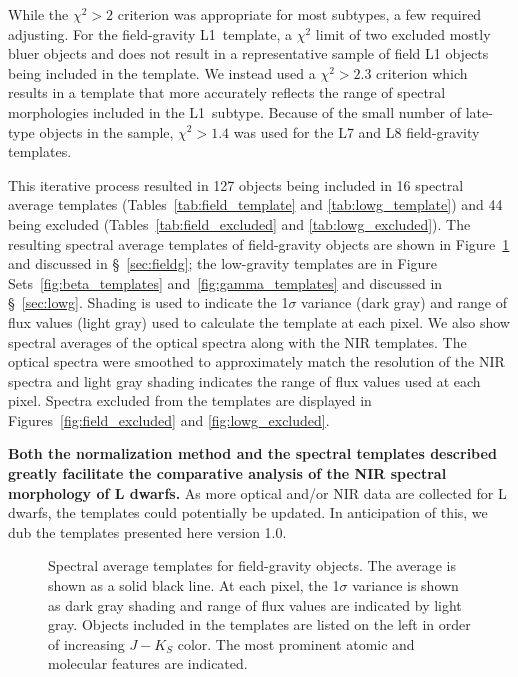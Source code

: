 \documentclass[12pt]{aastex6}
\begin{document}
While the $\chi^2 > 2$ criterion was appropriate for most subtypes, a few required adjusting.
For the field-gravity L1~template, a $\chi^2$ limit of two excluded mostly bluer objects and does not result in a representative sample of field L1 objects being included in the template.
We instead used a $\chi^2 > 2.3$ criterion which results in a template that more accurately reflects the range of spectral morphologies included in the L1~subtype.
Because of the small number of late-type objects in the sample, $\chi^2 > 1.4$ was used for the L7 and L8 field-gravity templates.

This iterative process resulted in 127 objects being included in 16 spectral average templates (Tables~\ref{tab:field_template} and \ref{tab:lowg_template}) and 44 being excluded (Tables~\ref{tab:field_excluded} and \ref{tab:lowg_excluded}).
The resulting spectral average templates of field-gravity objects are shown in Figure~\ref{fig:field_templates} and discussed in \S~\ref{sec:fieldg}; the low-gravity templates are in Figure Sets~\ref{fig:beta_templates} and~\ref{fig:gamma_templates} and discussed in \S~\ref{sec:lowg}.
Shading is used to indicate the 1$\sigma$ variance (dark gray) and range of flux values (light gray) used to calculate the template at each pixel.
We also show spectral averages of the optical spectra along with the NIR templates. The optical spectra were smoothed to approximately match the resolution of the NIR spectra and light gray shading indicates the range of flux values used at each pixel.
Spectra excluded from the templates are displayed in Figures~\ref{fig:field_excluded} and \ref{fig:lowg_excluded}.

\textbf{Both the normalization method and the spectral templates described greatly facilitate the comparative analysis of the NIR spectral morphology of L dwarfs.}
As more optical and/or NIR data are collected for L dwarfs, the templates could potentially be updated.
In anticipation of this, we dub the templates presented here version 1.0.

\begin{figure}
  \caption{Spectral average templates for field-gravity objects. The average is shown as a solid black line. At each pixel, the 1$\sigma$ variance is shown as dark gray shading and range of flux values are indicated by light gray. Objects included in the templates are listed on the left in order of increasing $J-K_S$ color. The most prominent atomic and molecular features are indicated.}
  \label{fig:field_templates}
\end{figure}
\end{document}
